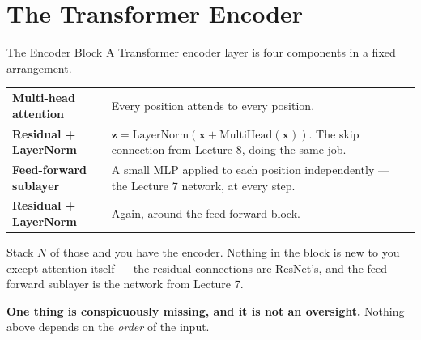 \documentclass[aspectratio=169, 11pt]{beamer}
\begin{document}
\section{The Transformer Encoder}


\begin{frame}{The Encoder Block}
  A Transformer encoder layer is four components in a fixed arrangement.
  \begin{center}
    {\small
    \begin{tabular}{p{3.5cm}p{9.0cm}}
      \toprule
      \textbf{Multi-head attention} & Every position attends to every position. \\[3pt]
      \textbf{Residual + LayerNorm} & $\mathbf{z} = \text{LayerNorm}(\mathbf{x} + \text{MultiHead}(\mathbf{x}))$.
      The skip connection from Lecture 8, doing the same job. \\[3pt]
      \textbf{Feed-forward sublayer} & A small MLP applied to each position independently ---
      the Lecture 7 network, at every step. \\[3pt]
      \textbf{Residual + LayerNorm} & Again, around the feed-forward block. \\
      \bottomrule
    \end{tabular}
    }
  \end{center}

  \vspace{0.1cm}
  Stack $N$ of those and you have the encoder. Nothing in the block is new to you except
  attention itself --- the residual connections are ResNet's, and the feed-forward sublayer is
  the network from Lecture 7.

  \vspace{0.1cm}
  \textbf{One thing is conspicuously missing, and it is not an oversight.} Nothing above depends
  on the \emph{order} of the input.
\end{frame}
\end{document}
